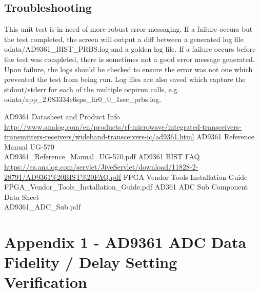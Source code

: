 \documentclass{article}
\begin{document}
\subsection*{Troubleshooting}
This unit test is in need of more robust error messaging. If a failure occurs but the test completed, the screen will output a diff between a generated log file odata/AD9361\_BIST\_PRBS.log and a golden log file. If a failure occurs before the test was completed, there is sometimes not a good error message generated. Upon failure, the logs should be checked to ensure the error was not one which prevented the test from being run. Log files are also saved which capture the stdout/stderr for each of the multiple ocpirun calls, e.g. odata/app\_2.083334e6sps\_fir0\_0\_1sec\_prbs.log.

\pagebreak
\begin{thebibliography}{1}

 AD9361 Datasheet and Product Info \\
\url{http://www.analog.com/en/products/rf-microwave/integrated-transceivers-transmitters-receivers/wideband-transceivers-ic/ad9361.html}
 AD9361 Reference Manual UG-570\\
AD9361\_Reference\_Manual\_UG-570.pdf
 AD9361 BIST FAQ \\
\url{https://ez.analog.com/servlet/JiveServlet/download/11828-2-28791/AD9361%20BIST%20FAQ.pdf}
 FPGA Vendor Tools Installation Guide \\
FPGA\_Vendor\_Tools\_Installation\_Guide.pdf
 AD361 ADC Sub Component Data Sheet \\AD9361\_ADC\_Sub.pdf
 
\end{thebibliography}
\pagebreak
\section{Appendix 1 - AD9361 ADC Data Fidelity / Delay Setting Verification}
\end{document}
